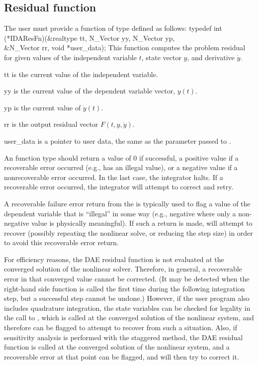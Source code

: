 {\subsection{Residual function}\label{ss:resFn}
The user must provide a function of type  defined as follows:
{
  typedef int (*IDAResFn)(&realtype tt, N\_Vector yy, N\_Vector yp,  \\
                          &N\_Vector rr, void *user\_data);
}
{
  This function computes the problem residual for given values
  of the independent variable $t$, state vector $y$, and derivative $\dot{y}$.
}
{
  \begin{args}
  \item[tt]
    is the current value of the independent variable.
  \item[yy]
    is the current value of the dependent variable vector, $y(t)$.
  \item[yp]
    is the current value of $\dot{y}(t)$.
  \item[rr]
    is the output residual vector $F(t,y,\dot{y})$.
  \item[user\_data]
    is a pointer to user data, the same as the 
    parameter passed to .
  \end{args}
}
{
  An  function type should return a value of $0$ if successful,
  a positive value if a recoverable error occurred (e.g.,  has an illegal
  value), or a negative value if a nonrecoverable error occurred.
  In the last case, the integrator halts.
  If a recoverable error occurred, the integrator will attempt to correct and retry.
}
{
  A recoverable failure error return from the  is typically used to
  flag a value of the dependent variable  that is ``illegal'' in
  some way (e.g., negative where only a non-negative value is physically
  meaningful).  If such a return is made, {\idas} will attempt to recover
  (possibly repeating the nonlinear solve, or reducing the step size)
  in order to avoid this recoverable error return.

  For efficiency reasons, the DAE residual function is not evaluated
  at the converged solution of the nonlinear solver. Therefore, in general, a
  recoverable error in that converged value cannot be corrected.  (It may be
  detected when the right-hand side function is called the first time during
  the following integration step, but a successful step cannot be undone.)
  However, if the user program also includes quadrature integration, the
  state variables can be checked for legality in the call to
  , which is called at the converged solution of the
  nonlinear system, and therefore {\idas} can be flagged to attempt
  to recover from such a situation. Also, if sensitivity analysis is
  performed with the staggered method, the DAE residual
  function is called at the converged solution of the nonlinear system,
  and a recoverable error at that point can be flagged, and {\idas}
  will then try to correct it.

}}
